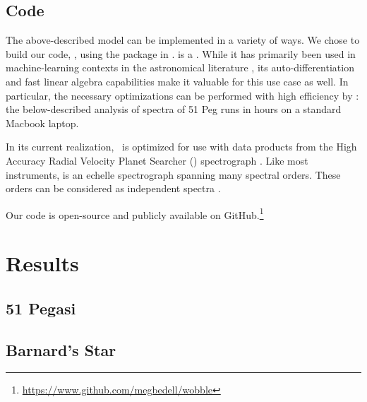 \documentclass[modern]{aastex62}
\newcommand{\Mdwarf}{Barnard's Star}
\begin{document}
\subsection{Code}

The above-described model can be implemented in a variety of ways. We chose to build our code, \wobble, using the \TF package \todo{[terminology?]} in . \TF is a . While it has primarily been used in machine-learning contexts in the astronomical literature , its auto-differentiation and fast linear algebra capabilities make it valuable for this use case as well. In particular, the necessary optimizations can be performed with high efficiency by \TF: the below-described analysis of  spectra of 51 Peg runs in  hours on a standard Macbook laptop.


In its current realization, \wobble\ is optimized for use with data products from the High Accuracy Radial Velocity Planet Searcher (\HARPS) spectrograph \citep{Mayor2003}. Like most \EPRV instruments, \HARPS is an echelle spectrograph spanning many spectral orders. These orders can be considered as independent spectra . 


Our code is open-source and publicly available on GitHub.\footnote{\url{https://www.github.com/megbedell/wobble}}



\section{Results}
\label{s:results}
\subsection{51 Pegasi}




\subsection{\Mdwarf}
\end{document}
